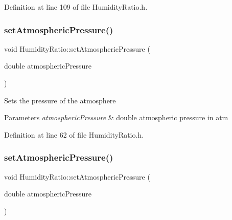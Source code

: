 Definition at line 109 of file Humidity\+Ratio.\+h.

\mbox{\label{class_humidity_ratio_aebab92be0c5eb4f23baaeb7268dad87e}} 
\subsubsection{\texorpdfstring{set\+Atmospheric\+Pressure()}{setAtmosphericPressure()}\hspace{0.1cm}{\footnotesize\ttfamily [1/3]}}
{\footnotesize\ttfamily void Humidity\+Ratio\+::set\+Atmospheric\+Pressure (\begin{DoxyParamCaption}\item[{double}]{atmospheric\+Pressure }\end{DoxyParamCaption})\hspace{0.3cm}{\ttfamily [inline]}}

Sets the pressure of the atmosphere


\begin{DoxyParams}{Parameters}
{\em atmospheric\+Pressure} & double atmospheric pressure in atm \\
\hline
\end{DoxyParams}


Definition at line 62 of file Humidity\+Ratio.\+h.

\mbox{\label{class_humidity_ratio_aebab92be0c5eb4f23baaeb7268dad87e}} 
\subsubsection{\texorpdfstring{set\+Atmospheric\+Pressure()}{setAtmosphericPressure()}\hspace{0.1cm}{\footnotesize\ttfamily [2/3]}}
{\footnotesize\ttfamily void Humidity\+Ratio\+::set\+Atmospheric\+Pressure (\begin{DoxyParamCaption}\item[{double}]{atmospheric\+Pressure }\end{DoxyParamCaption})\hspace{0.3cm}{\ttfamily [inline]}}

